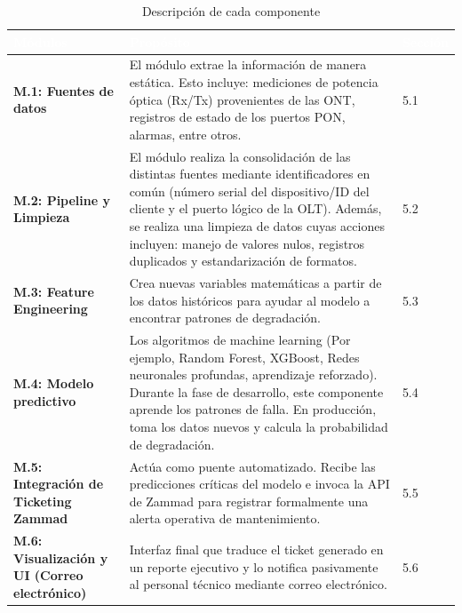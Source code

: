\documentclass[12pt,a4paper]{article}
\begin{document}
                    \begin{table}[H]
                        \centering
                        \begin{tabularx}{\textwidth}{|p{3.5cm}|X|p{2cm}|}
                            \hline
                            \rowcolor{black} 
                            \textcolor{white}{Módulos} & \textcolor{white}{Propósito} & \textcolor{white}{Sección}  \\ \hline
                            
                            \textbf{M.1: Fuentes de datos} & El módulo extrae la información de manera estática. Esto incluye: mediciones de potencia óptica (Rx/Tx) provenientes de las ONT, registros de estado de los puertos PON, alarmas, entre otros. & 5.1 \\ \hline
                            \textbf{M.2: Pipeline y Limpieza} & El módulo realiza la consolidación de las distintas fuentes mediante identificadores en común (número serial del dispositivo/ID del cliente y el puerto lógico de la OLT). Además, se realiza una limpieza de datos cuyas acciones incluyen: manejo de valores nulos, registros duplicados y estandarización de formatos. & 5.2 \\ \hline
                            \textbf{M.3: Feature Engineering} & Crea nuevas variables matemáticas a partir de los datos históricos para ayudar al modelo a encontrar patrones de degradación. & 5.3 \\ \hline
                            \textbf{M.4: Modelo predictivo} & Los algoritmos de machine learning (Por ejemplo, Random Forest, XGBoost, Redes neuronales profundas, aprendizaje reforzado). Durante la fase de desarrollo, este componente aprende los patrones de falla. En producción, toma los datos nuevos y calcula la probabilidad de degradación. & 5.4 \\ \hline
                            \textbf{M.5: Integración de Ticketing Zammad} & Actúa como puente automatizado. Recibe las predicciones críticas del modelo e invoca la API de Zammad para registrar formalmente una alerta operativa de mantenimiento. & 5.5 \\ \hline
                            \textbf{M.6: Visualización y UI (Correo electrónico)} & Interfaz final que traduce el ticket generado en un reporte ejecutivo y lo notifica pasivamente al personal técnico mediante correo electrónico. & 5.6 \\ \hline
                        \end{tabularx}
                        \caption{Descripción de cada componente}
                        \label{Tabla MODULO}
                    \end{table}
\end{document}
